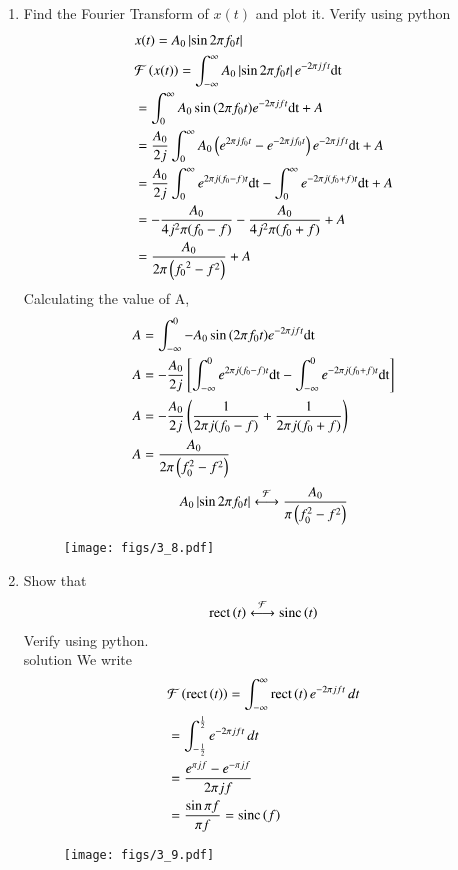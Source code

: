 \documentclass[journal,12pt,twocolumn]{IEEEtran}
\renewcommand\thesection{\arabic{section}}
\begin{document}
\begin{enumerate}[label=\thesection.\arabic*
,ref=\thesection.\theenumi]
\item Find the Fourier Transform of $x(t)$ and plot it. Verify using python \\\solution
\begin{align}
&x(t) = A_0 \left\vert\sin{2 \pi f_0 t}\right\vert \\
&\mathcal{F}\left(x(t)\right) = \int_{-\infty}^{\infty} A_0 \left\vert\sin{2 \pi f_0 t}\right\vert e^{-2 \pi jft} \text{dt} \\
&= \int_{0}^{\infty} A_0 \sin{\ensuremath{\left(2 \pi f_0 t\right)}} e^{-2 \pi jft} \text{dt} + A\\
&= \frac{A_0}{2j} \int_{0}^{\infty} A_0 \left(e^{2 \pi jf_0t} - e^{-2 \pi jf_0t}\right)e^{-2 \pi jft} \text{dt} + A \\
&= \frac{A_0}{2j} \int_{0}^{\infty} e^{2 \pi j (f_0 - f) t} \text{dt} - \int_{0}^{\infty} e^{-2 \pi j (f_0 + f) t} \text{dt} + A \\
&= -\frac{A_0}{4 j^2 \pi (f_0 - f)} - \frac{A_0}{4 j^2 \pi (f_0 + f)} + A \\
&= \frac{A_0}{2 \pi \left({f_0}^2 - f^2\right)} + A
\end{align}
Calculating the value of A, 
\begin{align}
	&A = \int_{-\infty}^{0} -A_0 \sin{\ensuremath{\left(2 \pi f_0 t\right)}} e^{-2 \pi jft} \text{dt} \\
	&A = -\frac{A_0}{2j} \, \Biggl[ \int_{-\infty}^{0} e^{2 \pi j (f_0 - f) t} \text{dt} - \int_{-\infty}^{0} e^{-2 \pi j (f_0 + f) t} \text{dt} \Biggr] \\
	&A = -\frac{A_0}{2j} \, \Biggl( \frac{1}{2 \pi j (f_0 - f)} + \frac{1}{2 \pi j (f_0 + f)} \Biggr) \\
	&A = \frac{A_0}{2 \pi \left(f_{0}^2 - f^2\right)}
\end{align}
\begin{align}
	A_0 \left\vert\sin{2 \pi f_0 t}\right\vert \overset{\mathcal{F}}{ \longleftrightarrow} \frac{A_0}{\pi \left(f_{0}^2 - f^2\right)}
\end{align}
\begin{figure}[!ht]
	\centering
	\texttt{[image: figs/3\_8.pdf]}
\end{figure}


\item Show that 
\begin{align}
\text{rect}\left(t\right) \overset{\mathcal{F}}{ \longleftrightarrow} \text{sinc}\left(t\right)
\end{align}
Verify using python. \\
\solution
solution We write
\begin{align}
	&\mathcal{F}\left(\text{rect}\left(t\right)\right) = \int_{-\infty}^{\infty}\text{rect}\left(t\right)e^{-2\pi jft}\, dt \\
            &=\int_{-\frac{1}{2}}^{\frac{1}{2}}e^{-2\pi jft}\, dt \\
            &=\frac{e^{\pi jf} - e^{-\pi jf}}{2\pi jf} \\
	    &= \frac{\sin{\pi f}}{\pi f} = \text{sinc}\left(f\right)
            \label{eq:fourier-rect}
\end{align}
\begin{figure}[!ht]
	\centering
	\texttt{[image: figs/3\_9.pdf]}
\end{figure}



\end{enumerate}
\end{document}
